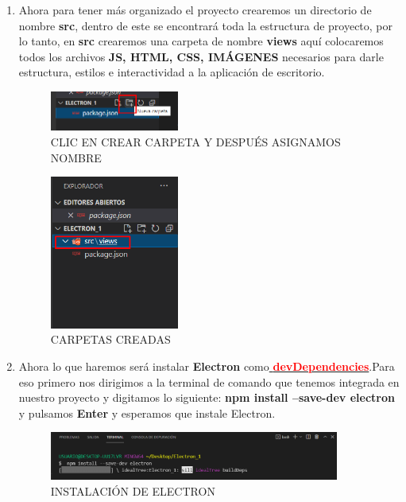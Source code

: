 \begin{enumerate}
  \item Ahora para tener más organizado el proyecto crearemos un directorio de nombre \textbf{src}, dentro de este se encontrará toda la estructura de proyecto, por lo tanto, en \textbf{src} crearemos una carpeta de nombre \textbf{views} aquí colocaremos todos los archivos \textbf{JS, HTML, CSS, IMÁGENES} necesarios para darle estructura, estilos e interactividad a la aplicación de escritorio.
   \begin{figure}[H]
        \centering
        \includegraphics[width=0.4\textwidth]{img/electron6.png}
        \caption{CLIC EN CREAR CARPETA Y DESPUÉS ASIGNAMOS NOMBRE }
    \end{figure}
    \begin{figure}[H]
        \centering
        \includegraphics[width=0.4\textwidth]{img/electron7.png}
        \caption{CARPETAS CREADAS}
    \end{figure}
    \newpage
    \item Ahora lo que haremos será instalar\textbf{ Electron} como\hyperlink{thesentence}{\textcolor{red}{\textbf{ devDependencies}}}.Para eso primero nos dirigimos a la terminal de comando que tenemos integrada en nuestro proyecto y digitamos lo siguiente: \textbf{npm install --save-dev electron} y pulsamos \textbf{Enter} y esperamos que instale Electron.
    
      \begin{figure}[H]
        \centering
        \includegraphics[width=0.9\textwidth]{img/electron8.png}
        \caption{INSTALACIÓN DE ELECTRON}
    \end{figure}
    

\end{enumerate}
